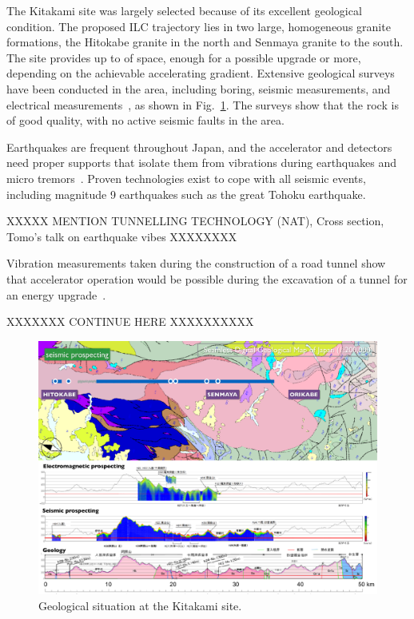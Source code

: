 The Kitakami site was largely selected because of its excellent geological condition. 
The proposed ILC trajectory lies in two large, homogeneous granite formations, the Hitokabe granite in the north and Senmaya granite to the south.
The site provides up to  of space, enough for a possible  upgrade or more, depending on the achievable accelerating gradient.  
Extensive geological surveys have been conducted in the area, including boring, seismic measurements, and electrical measurements~\cite{Sanuki:2015a}, as shown in Fig.~\ref{fig:kitakami-geology}.
The surveys show that the rock is of good quality, with no active seismic faults in the area.

Earthquakes are frequent throughout Japan, and the accelerator and detectors need  proper supports that isolate them from vibrations during earthquakes and micro tremors~\cite{Sanuki:2018b}. 
Proven technologies exist to cope with all seismic events, including magnitude 9 earthquakes such as the great Tohoku earthquake. 

XXXXX MENTION TUNNELLING TECHNOLOGY (NAT), Cross section, Tomo's talk on earthquake vibes XXXXXXXX

Vibration measurements taken during the construction of a road tunnel show that accelerator operation would be possible during the excavation of a tunnel for an energy upgrade~\cite{Sanuki:2018a}.


XXXXXXX CONTINUE HERE XXXXXXXXXX

\begin{figure}[htbp]
   \includegraphics[width=\hsize]{chapters/figures/Kitakami_Geology}
\caption{Geological situation at the Kitakami site.}
\label{fig:kitakami-geology}
\end{figure}


